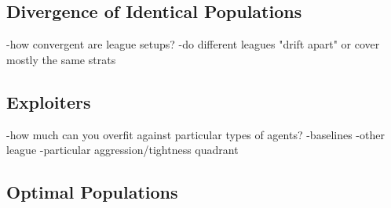 \subsection{Divergence of Identical Populations}
-how convergent are league setups?
    -do different leagues "drift apart" or cover mostly the same strats

\subsection{Exploiters}
-how much can you overfit against particular types of agents?
    -baselines
    -other league
    -particular aggression/tightness quadrant

\subsection{Optimal Populations}